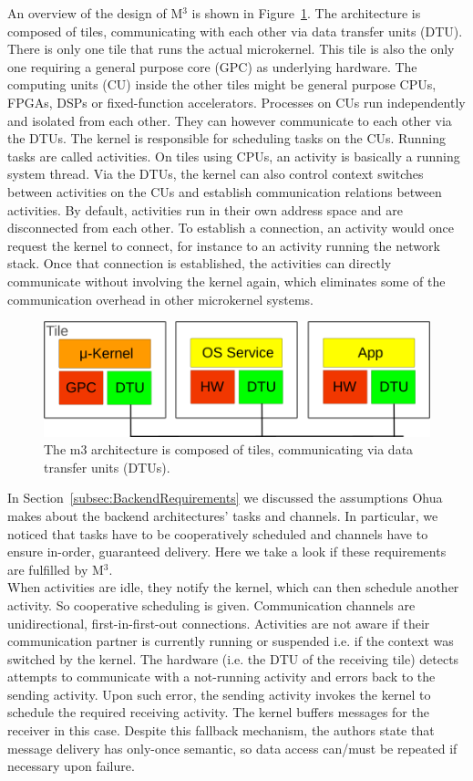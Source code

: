 An overview of the design of M$^3$ is shown in Figure~\ref{fig:m3}. The architecture is composed of tiles, communicating with each other via data transfer units (DTU). There is only one tile that runs the actual microkernel. This tile is also the only one requiring a general purpose core (GPC) as underlying hardware. The computing units (CU) inside the other tiles might be general purpose CPUs, FPGAs, DSPs or fixed-function accelerators. Processes on CUs run independently and isolated from each other. They can however communicate to each other via the DTUs. The kernel is responsible for scheduling tasks on the CUs. Running tasks are called activities. On tiles using CPUs, an activity is basically a running system thread. Via the DTUs, the kernel can also control context switches between activities on the CUs and establish communication relations between activities. By default, activities run in their own address space and are disconnected from each other. To establish a connection, an activity  would once request the kernel to connect, for instance to an activity  running the network stack. Once that connection is established, the activities can directly communicate without involving the kernel again, which eliminates some of the communication overhead in other microkernel systems. 

\begin{figure}[H]
    \centering
    \includegraphics[scale= 0.7]{figures/m3.png}
    \caption{The m3 architecture is composed of tiles, communicating via data transfer units (DTUs).}
    \label{fig:m3}
\end{figure}

In Section~\ref{subsec:BackendRequirements} we discussed the assumptions Ohua makes about the backend architectures' tasks and channels. In particular, we noticed that tasks have to be cooperatively scheduled and channels have to ensure in-order, guaranteed delivery. Here we take a look if these requirements are fulfilled by M$^3$.\\

When activities are idle, they notify the kernel, which can then schedule another activity. So cooperative scheduling is given. Communication channels are unidirectional, first-in-first-out connections. Activities are not aware if their communication partner is currently running or suspended i.e. if the context was switched by the kernel. The hardware (i.e. the DTU of the receiving tile) detects attempts to communicate with a not-running activity and errors back to the sending activity. Upon such error, the sending activity invokes the kernel to schedule the required receiving activity. The kernel buffers messages for the receiver in this case. Despite this fallback mechanism, the authors state that message delivery has only-once semantic, so data access can/must be repeated if necessary upon failure. 

